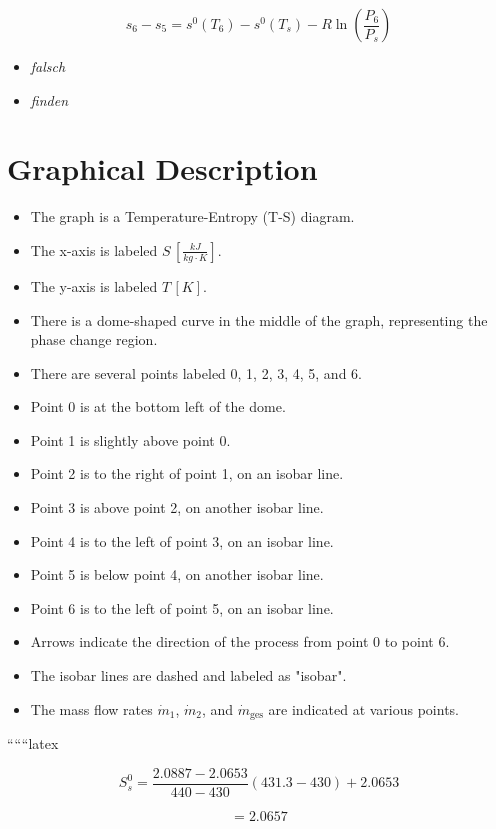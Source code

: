 \[
s_6 - s_5 = s^0 (T_6) - s^0 (T_s) - R \ln \left( \frac{P_6}{P_s} \right)
\]

\begin{itemize}
    \item \textit{falsch}
    \item \textit{finden}
\end{itemize}

\section*{Graphical Description}

\begin{itemize}
    \item The graph is a Temperature-Entropy (T-S) diagram.
    \item The x-axis is labeled $S \, [\frac{kJ}{kg \cdot K}]$.
    \item The y-axis is labeled $T \, [K]$.
    \item There is a dome-shaped curve in the middle of the graph, representing the phase change region.
    \item There are several points labeled 0, 1, 2, 3, 4, 5, and 6.
    \item Point 0 is at the bottom left of the dome.
    \item Point 1 is slightly above point 0.
    \item Point 2 is to the right of point 1, on an isobar line.
    \item Point 3 is above point 2, on another isobar line.
    \item Point 4 is to the left of point 3, on an isobar line.
    \item Point 5 is below point 4, on another isobar line.
    \item Point 6 is to the left of point 5, on an isobar line.
    \item Arrows indicate the direction of the process from point 0 to point 6.
    \item The isobar lines are dashed and labeled as "isobar".
    \item The mass flow rates $\dot{m}_1$, $\dot{m}_2$, and $\dot{m}_{\text{ges}}$ are indicated at various points.
\end{itemize}

``````latex

\[
S_s^0 = \frac{2.0887 - 2.0653}{440 - 430} (431.3 - 430) + 2.0653
\]

\[
= 2.0657
\]

